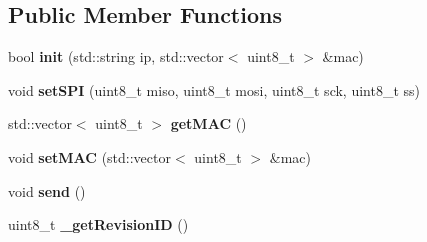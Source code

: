 \subsection*{Public Member Functions}
\begin{DoxyCompactItemize}
\item 
\mbox{\label{classEnc28j60_a02091be5ccc917e0e2faaa7053e9340d}} 
bool {\bfseries init} (std\+::string ip, std\+::vector$<$ uint8\+\_\+t $>$ \&mac)
\item 
\mbox{\label{classEnc28j60_a52b9b6f5b16f09bf6734cbd92283fa01}} 
void {\bfseries set\+S\+PI} (uint8\+\_\+t miso, uint8\+\_\+t mosi, uint8\+\_\+t sck, uint8\+\_\+t ss)
\item 
\mbox{\label{classEnc28j60_aa35d466c70b46fe8a8c23c688fe12bfa}} 
std\+::vector$<$ uint8\+\_\+t $>$ {\bfseries get\+M\+AC} ()
\item 
\mbox{\label{classEnc28j60_ad26a59006c5dc25efe10e7787e10ad8d}} 
void {\bfseries set\+M\+AC} (std\+::vector$<$ uint8\+\_\+t $>$ \&mac)
\item 
\mbox{\label{classEnc28j60_a6725c414929ca567d39c30ddd2cebbc3}} 
void {\bfseries send} ()
\item 
\mbox{\label{classEnc28j60_a3186dc79ca3d83c0f68f7d8479a2df4a}} 
uint8\+\_\+t {\bfseries \+\_\+get\+Revision\+ID} ()
\end{DoxyCompactItemize}
